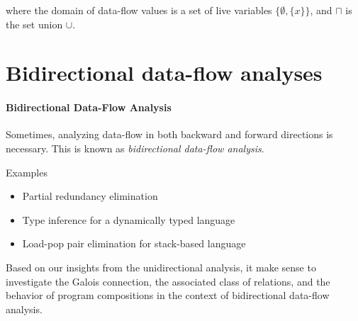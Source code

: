 \documentclass{llncs}
\newcommand{\meet}{\sqcap}
\begin{document}
  where the domain of data-flow values is a set of live variables $\{\emptyset, \{ x \}\}$, and $\meet$ is the set union $\cup$.

\section{Bidirectional data-flow analyses}  

  \paragraph{Bidirectional Data-Flow Analysis}
  Sometimes, analyzing data-flow in both backward and forward directions is necessary. This is known as \emph{bidirectional data-flow analysis}.

  Examples
  \begin{itemize}
    \item Partial redundancy elimination
    \item Type inference for a dynamically typed language
    \item Load-pop pair elimination for stack-based language
  \end{itemize}
  Based on our insights from the unidirectional analysis, it make sense to investigate the Galois connection, the associated class of relations, and the behavior of program compositions in the context of bidirectional data-flow analysis.
\end{document}
